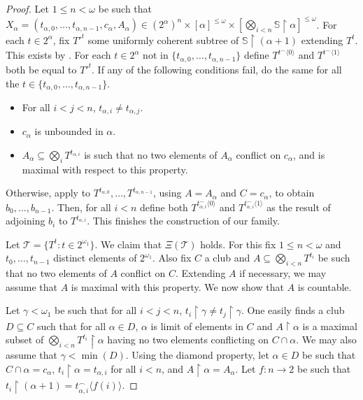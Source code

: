 \documentclass[10pt,a4paper]{amsart}
\theoremstyle{definition}
\newcommand{\seb}{\subseteq}
\newcommand{\res}{\!\upharpoonright\!}
\newcommand{\tup}[1]{\langle#1\rangle}
\newcommand{\1}{\mathbf{1}}
\newcommand{\T}{\mathcal{T}}
\newcommand{\prop}{\Xi}
\renewcommand{\S}{\mathbb{S}}
\begin{document}
\begin{proof}
  Let $1 \le n < \omega$ be such that $X_{\alpha} =
  (t_{\alpha,0},\dots,t_{\alpha,n-1},c_{\alpha},A_{\alpha}) \in
  (2^{\alpha})^{n}\times [\alpha]^{\le\omega}\times
    [\bigotimes_{i <n} \S\res \alpha]^{\le\omega}$.
  For each $t \in 2^{\alpha}$, fix  ${T'}^{t}$
  some uniformly coherent
  subtree of $\S \res (\alpha+1)$ extending $T^{t}$. This exists
  by . For each $t \in 2^{\alpha}$ not in
  $\{t_{\alpha,0},\dots,t_{\alpha,n-1}\}$ define
  $T^{t^{\frown}\tup{0}}$ and $T^{t^{\frown}\tup{1}}$ both be equal
  to ${T'}^{t}$.  
  If any of the following conditions fail, do the
  same for all the $t \in \{t_{\alpha,0},\dots,t_{\alpha,n-1}\}$.
  \begin{itemize}
    \item For all $i < j < n$, $t_{\alpha,i} \neq t_{\alpha,j}$.
    \item $c_{\alpha}$ is unbounded in $\alpha$.
    \item $A_{\alpha} \seb \bigotimes_{i}T^{t_{\alpha,i}}$ is such that
    no two elements of $A_{\alpha}$ conflict on $c_{\alpha}$, and is maximal
    with respect to this property.
  \end{itemize}
  Otherwise, apply 
  to $T^{t_{\alpha,0}},\dots,T^{t_{\alpha,n-1}}$, using $A = A_{\alpha}$
  and $C = c_{\alpha}$,
  to obtain $b_{0},\dots,
  b_{n-1}$. Then, for all $i < n$ define
  both $T^{t_{\alpha,i}^{\frown}\tup{0}}$ and
  $T^{t_{\alpha,i}^{\frown}\tup{1}}$ as the result of adjoining
  $b_{i}$ to $T^{t_{\alpha,i}}$. This finishes the construction
  of our family.

  Let $\T = \{T^{t} : t \in 2^{\omega_{1}}\}$. We claim
  that $\prop(\T)$ holds. For this fix $1 \le n < \omega$
  and $t_{0},\dots,t_{n-1}$ distinct elements of $2^{\omega_{1}}$.
  Also fix $C$ a club and $A \seb \bigotimes_{i < n}T^{t_{i}}$
  be such that no two elements of $A$ conflict on $C$.
  Extending $A$ if necessary, we may assume that $A$ is maximal
  with this property. We now show that $A$ is countable.

  Let $\gamma < \omega_{1}$ be such that for all $i < j < n$,
  $t_{i}\res \gamma \neq t_{j}\res \gamma$. One easily finds
  a club $D \seb C$ such that for all $\alpha \in D$,
  $\alpha$ is limit of elements in $C$ and $A \res \alpha$ is a maximal
  subset of $\bigotimes_{i < n}T^{t_{i}}\res \alpha$ having
  no two elements conflicting on $C \cap \alpha$. We may
  also assume that $\gamma < \min(D)$. Using the
  diamond property, let $\alpha \in D$ be such that
  $C \cap \alpha = c_{\alpha}$, $t_{i}\res \alpha = t_{\alpha,i}$
  for all $i < n$, and $A \res \alpha = A_{\alpha}$. Let
  $f : n \to 2$ be such that $t_{i}\res(\alpha+1) = t_{\alpha,i}^{\frown}
  \tup{f(i)}$.


\end{proof}
\end{document}
